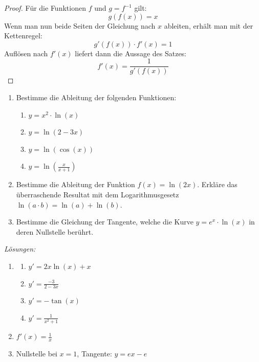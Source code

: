 \begin{proof}
	Für die Funktionen $f$ und $g=f^{-1}$ gilt:
	$$ g(f(x)) = x$$
	Wenn man nun beide Seiten der Gleichung nach $x$ ableiten, erhält man mit der Kettenregel:
	$$ g'(f(x)) \cdot f'(x) = 1$$
	Auflösen nach $f'(x)$ liefert dann die Aussage des Satzes:
	$$f'(x) = \frac{1}{g'(f(x))}$$
\end{proof}

\clearpage
\begin{ueb}
	{}{}
	\begin{enumerate}
		\item Bestimme die Ableitung der folgenden Funktionen:
		      \begin{enumerate}
			      \item $y= x^2 \cdot \ln(x)$
			      \item $y= \ln(2-3x)$
			      \item $y=\ln(\cos(x))$
			      \item $y= \ln\left(\frac{x}{x+1}\right)$


		      \end{enumerate}
		\item Bestimme die Ableitung der Funktion $f(x) = \ln(2x)$. Erkläre das überraschende Resultat mit dem Logarithmusgesetz $\ln(a\cdot b) = \ln(a) + \ln(b)$.
		\item Bestimme die Gleichung der Tangente, welche die Kurve $y=e^x\cdot \ln(x)$ in deren Nullstelle berührt.
	\end{enumerate}
\end{ueb}

\clearpage
\emph{Lösungen:}
\begin{enumerate}
	\item
	      \begin{enumerate}
		      \item $y' = 2x \ln(x) + x$
		      \item $y'= \frac{-3}{2-3x}$
		      \item $y'= -\tan(x)$
		      \item $y'= \frac{1}{x^2+1}$


	      \end{enumerate}
	\item $f'(x) = \frac{1}{x}$
	\item Nullstelle bei $x=1$, Tangente: $y= ex-e$
\end{enumerate}








































